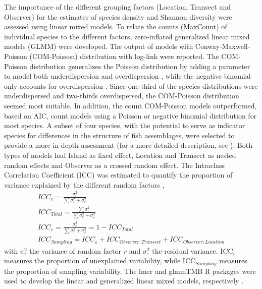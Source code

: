 \documentclass[10pt,letterpaper]{article}
\begin{document}
The importance of the different grouping factors (Location, Transect and Observer) for the estimates of species density and Shannon diversity were assessed using linear mixed models.
To relate the counts (MaxCount) of individual species to the different factors, zero-inflated generalized linear mixed models (GLMM) were developed. The output of models with Conway-Maxwell-Poisson (COM-Poisson) distribution with log-link were reported. The COM-Poisson distribution generalizes the Poisson distribution by adding a parameter to model both underdispersion and overdispersion \cite{Lynch2014}, while the negative binomial only accounts for overdispersion \cite{Imoto2014ADistribution}. Since one-third of the species distributions were underdispersed and two-thirds overdispersed, the COM-Poisson distribution seemed most suitable. In addition, the count COM-Poisson models outperformed, based on AIC, count models using a Poisson or negative binomial distribution for most species. A subset of four species, with the potential to serve as indicator species for differences in the structure of fish assemblages, were selected to provide a more in-depth assessment (for a more detailed description, see ). Both types of models had Island as fixed effect, Location and Transect as nested random effects and Observer as a crossed random effect. The Intraclass Correlation Coefficient (ICC) was estimated to quantify the proportion of variance explained by the different random factors  \cite{Nakagawa2017},
\begin{equation}
\label{eq:ICC}
\begin{array}{l}
ICC_{r}=\frac{\sigma_{r}^{2}}{\sum\sigma_{r}^{2}+\sigma_{\varepsilon}^{2}}\\
ICC_{Total}=\frac{\sum\sigma_{r}^{2}}{\sum\sigma_{r}^{2}+\sigma_{\varepsilon}^{2}}\\
ICC_{\varepsilon}=\frac{\sigma_{\varepsilon}^{2}}{\sum\sigma_{r}^{2}+\sigma_{\varepsilon}^{2}}=1-ICC_{Total}\\
ICC_{Sampling}=ICC_{\varepsilon}+ICC_{Observer:Transect}+ICC_{Observer:Location}
\end{array}
\end{equation}
with $\sigma_{r}^{2}$ the variance of random factor $r$ and $\sigma_{\varepsilon}^{2}$ the residual variance. ICC$_{\varepsilon}$ measures the proportion of unexplained variability, while ICC$_{Sampling}$ measures the proportion of sampling variability. 
The lmer and glmmTMB R packages were used to develop the linear and generalized linear mixed models, respectively \cite{Brooks2017}.
\end{document}
